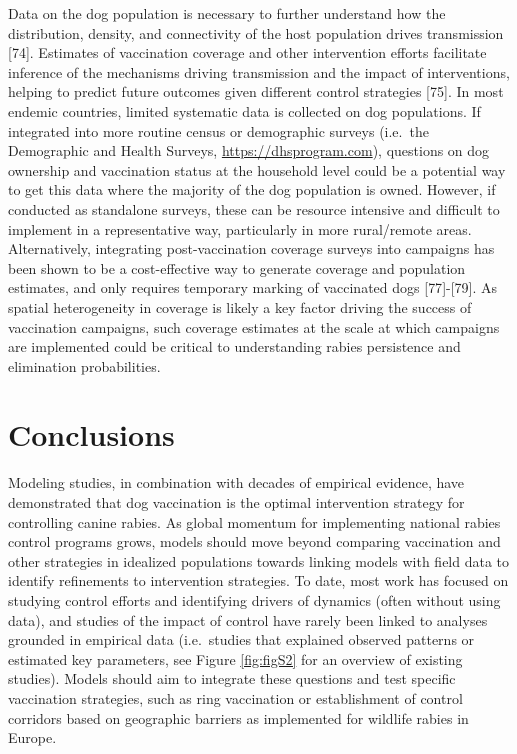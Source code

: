 \documentclass[
  oneside]{book}
\begin{document}
Data on the dog population is necessary to further understand how the
distribution, density, and connectivity of the host population drives
transmission {[}74{]}. Estimates of vaccination coverage and other
intervention efforts facilitate inference of the mechanisms driving
transmission and the impact of interventions, helping to predict future
outcomes given different control strategies {[}75{]}. In most endemic
countries, limited systematic data is collected on dog populations. If
integrated into more routine census or demographic surveys (i.e.~the
Demographic and Health Surveys, \url{https://dhsprogram.com}), questions on
dog ownership and vaccination status at the household level could be a
potential way to get this data where the majority of the dog population
is owned. However, if conducted as standalone surveys, these can be
resource intensive and difficult to implement in a representative way,
particularly in more rural/remote areas. Alternatively, integrating
post-vaccination coverage surveys into campaigns has been shown to be a
cost-effective way to generate coverage and population estimates, and
only requires temporary marking of vaccinated dogs {[}77{]}-{[}79{]}. As
spatial heterogeneity in coverage is likely a key factor driving the
success of vaccination campaigns, such coverage estimates at the scale
at which campaigns are implemented could be critical to understanding
rabies persistence and elimination probabilities.

\hypertarget{conclusions}{%
\section{Conclusions}\label{conclusions}}

Modeling studies, in combination with decades of empirical evidence,
have demonstrated that dog vaccination is the optimal intervention
strategy for controlling canine rabies. As global momentum for
implementing national rabies control programs grows, models should move
beyond comparing vaccination and other strategies in idealized
populations towards linking models with field data to identify
refinements to intervention strategies. To date, most work has focused
on studying control efforts and identifying drivers of dynamics (often
without using data), and studies of the impact of control have rarely
been linked to analyses grounded in empirical data (i.e.~studies that
explained observed patterns or estimated key parameters, see
Figure \ref{fig:figS2} for an overview of existing studies). Models
should aim to integrate these questions and test specific vaccination
strategies, such as ring vaccination or establishment of control
corridors based on geographic barriers as implemented for wildlife
rabies in Europe.
\end{document}
